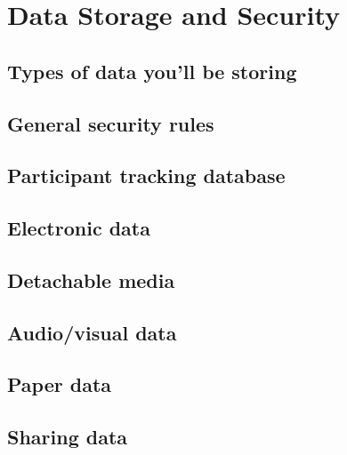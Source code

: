 \documentclass[
]{book}
\begin{document}
\hypertarget{data-storage-and-security}{%
\chapter{Data Storage and Security}\label{data-storage-and-security}}

\hypertarget{types-of-data-youll-be-storing}{%
\section{Types of data you'll be storing}\label{types-of-data-youll-be-storing}}

\hypertarget{general-security-rules}{%
\section{General security rules}\label{general-security-rules}}

\hypertarget{participant-tracking-database}{%
\section{Participant tracking database}\label{participant-tracking-database}}

\hypertarget{electronic-data}{%
\section{Electronic data}\label{electronic-data}}

\hypertarget{detachable-media}{%
\section{Detachable media}\label{detachable-media}}

\hypertarget{audiovisual-data}{%
\section{Audio/visual data}\label{audiovisual-data}}

\hypertarget{paper-data}{%
\section{Paper data}\label{paper-data}}

\hypertarget{sharing-data}{%
\section{Sharing data}\label{sharing-data}}
\end{document}
